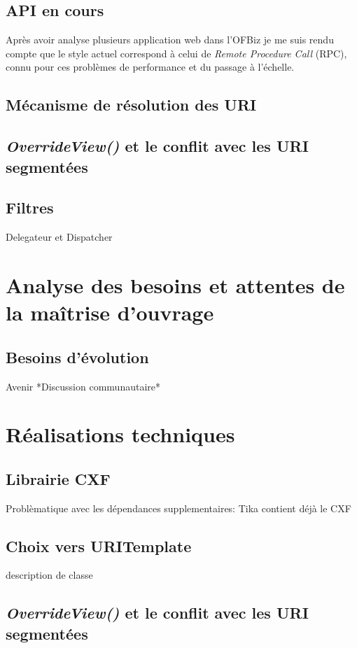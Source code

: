 \subsection{API en cours}
Après avoir analyse plusieurs application web dans l'OFBiz je me suis rendu compte que le style actuel correspond à celui de \emph{Remote Procedure Call }(RPC), connu pour ces problèmes de performance et du passage à l'échelle. 

\subsection{Mécanisme de résolution des URI}
\subsection{\textit{OverrideView()} et le conflit avec les URI segmentées}
\subsection{Filtres}
Delegateur et Dispatcher






\section{Analyse des besoins et attentes de la maîtrise d'ouvrage}
\subsection{Besoins d'évolution}
Avenir
*Discussion communautaire*



\section{Réalisations techniques}

\subsection{Librairie CXF}
Problèmatique avec les dépendances supplementaires: 
Tika contient déjà le CXF
\subsection{Choix vers URITemplate}
description de classe
\subsection{\textit{OverrideView()} et le conflit avec les URI segmentées}
